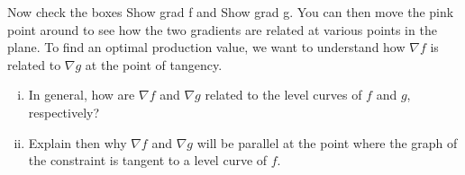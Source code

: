 \begin{pa}
\begin{comment}

As we move the $a$ slider back and forth, we see that the values of $a$ for this the level curves of $f$ intersect the constraint $g$ all correspond to value of $a$ less than about 38. The level curves of $f$ with values less than 38 all intersect the constraint at two points, and the largest value of $a$ (and hence $f$) occurs when the level curve of $f$ intersects the constraint at only one point -- or when the level curve of $f$ is tangent to the constraint.



\end{comment}


    \item Now check the boxes Show grad f and Show grad g. You can then move the pink point around to see how the two gradients are related at various points in the plane. To find an optimal production value, we want to understand how $\nabla f$ is related to $\nabla g$ at the point of tangency.
        \begin{enumerate}[i.]
        \item In general, how are $\nabla f$ and $\nabla g$ related to the level curves of $f$ and $g$, respectively?



\begin{comment}

We have seen that the gradient of a function is always orthogonal to its level curves.


\end{comment}

        \item Explain then why $\nabla f$ and $\nabla g$ will be parallel at the point where the graph of the constraint is tangent to a level curve of $f$.



\begin{comment}

When the graph of the constraint is tangent to a level curve of $f$, then the two curves will have the same direction at this point. This implies any two vectors that are orthogonal to these level curves will have to be parallel at the point of tangency. So $\nabla f$ and $\nabla g$ will have to be parallel at the point of tangency.



\end{comment}

        \end{enumerate}
    \ea
\end{pa} \afterpa 